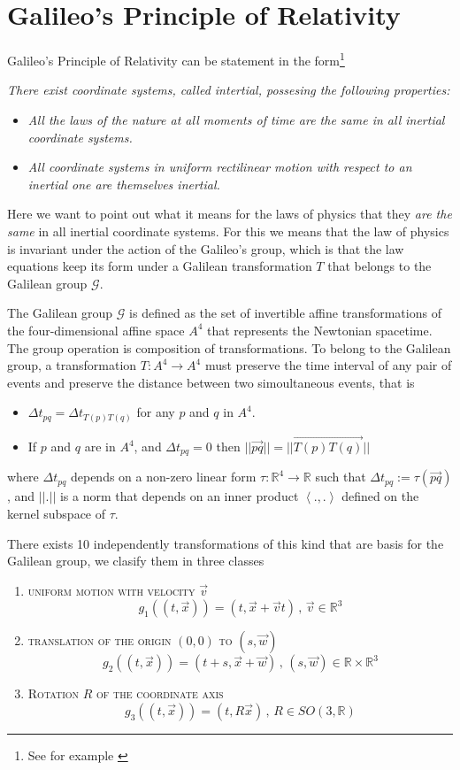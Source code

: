\documentclass[10pt, letterpaper, oneside]{book}
\theoremstyle{theorem} %
\theoremstyle{theorem} %
\theoremstyle{definition}
\theoremstyle{remark}
\theoremstyle{definition}
\theoremstyle{definition}
\theoremstyle{theorem}
\def\Re{\mathbb{R}}
\begin{document}
\section{Galileo's Principle of Relativity}
Galileo's Principle of Relativity can be statement in the form\footnote{See for example \cite{arnold}}

\textit{There exist coordinate systems, called intertial, possesing the following properties:}
\begin{itemize}
	\item[\textit{1}] \textit{All the laws of the nature at all moments of time are the same in all inertial coordinate systems.}
	\item[\textit{2}] \textit{All coordinate systems in uniform rectilinear motion with respect to an inertial one are themselves inertial.}
\end{itemize}

Here we want to point out what it means for the laws of physics that they \textit{are the same} in all inertial coordinate systems. For this we means that the law of physics is invariant under the action of the Galileo's group, which is that the law equations keep its form under a Galilean transformation $T$ that belongs to the Galilean group $\mathscr{G}$.

The Galilean group $\mathscr{G}$ is defined as the set of invertible affine transformations of the four-dimensional affine space $A^4$ that represents the Newtonian spacetime. The group operation is composition of transformations. To belong to the Galilean group, a transformation ${T:A^4\to A^4}$ must preserve the time interval of any pair of events and preserve the distance between two simoultaneous events, that is
\begin{itemize}
	\item[1.] $\Delta  t_{pq} = \Delta t_{T(p)T(q)}
$ for any $p$ and $q$ in $A^4$.
	\item[2.] If $p$ and $q$ are in $A^4$, and $\Delta t_{pq}=0$ then $||\overrightarrow{pq}||=|| \overrightarrow{T(p)T(q)}||$
\end{itemize}

where $\Delta t_{pq}$ depends on a non-zero linear form $\tau:\Re^4\to\Re$ such that $\Delta t_{pq}:=\tau(\overrightarrow{pq})$, and $||.||$ is a norm that depends on an inner product $\left<.,.\right>$ defined on the kernel subspace of $\tau$.

There exists 10 independently transformations of this kind that are basis for the Galilean group, we clasify them in three classes
\begin{enumerate}
	\item \textsc{uniform motion with velocity} $\vec{v}$
	$$g_1((t,\vec{x}))=(t,\vec{x}+\vec{v}t)\, , \, \vec{v}\in\Re^3$$
	\item \textsc{translation of the origin $(0,0)$ to $(s,\vec{w})$}
	$$g_2((t,\vec{x}))=(t+s,\vec{x}+\vec{w})\, , \, (s,\vec{w})\in\Re\times\Re^3 $$
	\item \textsc{Rotation $R$ of the coordinate axis}
	$$g_3((t,\vec{x}))=(t,R\vec{x})\, , \, R\in SO(3,\Re)$$
\end{enumerate}
\end{document}
